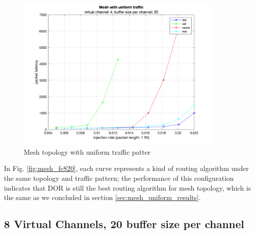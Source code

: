 \begin{figure}[H]
    \centering
    \includegraphics[width=0.9\textwidth]{Images/chap2/flow_control/fc4_20.png}
    \caption{Mesh topology with uniform traffic patter}
    \label{fig:mesh_fc420}
\end{figure}

In Fig. \ref{fig:mesh_fc820}, each curve represents a kind of routing algorithm under the same topology and traffic pattern; the performance of this configuration indicates that DOR is still the best routing algorithm for mesh topology, which is the same as we concluded in section \ref{sec:mesh_uniform_results}.


\subsection{8 Virtual Channels, 20 buffer size per channel}

